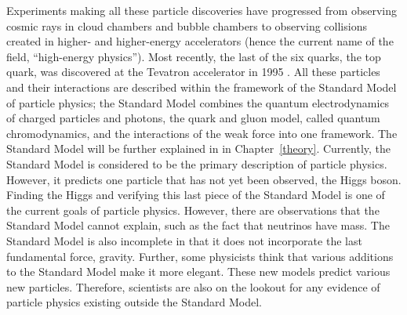 Experiments making all these particle discoveries 
have progressed from observing cosmic rays 
in cloud chambers and bubble chambers 
to observing collisions created in higher- and higher-energy 
accelerators 
(hence the current name of the field, 
``high-energy physics'').  
Most recently, the last of the six quarks, the top quark, 
was discovered at the Tevatron accelerator in 1995 
\cite{topD0} \cite{topCDF}.  
All these particles and their interactions are described 
within the framework of the Standard Model of particle physics; 
the Standard Model combines the quantum electrodynamics 
of charged particles and photons, the quark and gluon model, 
called quantum chromodynamics, 
and the interactions of the weak force into one framework.  
The Standard Model will be further explained in 
in Chapter~\ref{theory}. 
Currently, the Standard Model is considered to be the 
primary description of particle physics.  
However, it predicts one particle that has not yet been 
observed, the Higgs boson.  
Finding the Higgs and verifying this last piece 
of the Standard Model 
is one of the current goals of 
particle physics.  
However, there are observations that 
the Standard Model cannot explain, 
such as the fact that neutrinos have mass.  
The Standard Model is also incomplete in that 
it does not incorporate the last fundamental force, gravity.  
Further, some physicists think that various additions 
to the Standard Model make it more elegant.  
These new models predict various new particles.  
Therefore, scientists are also on the lookout 
for any evidence of particle physics existing 
outside the Standard Model.  





